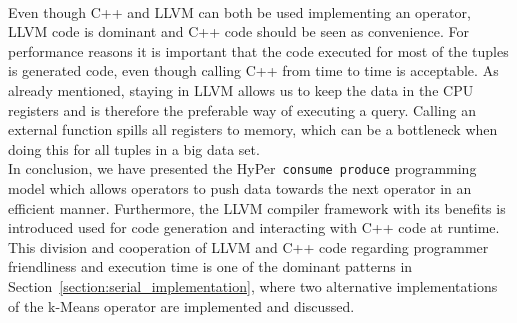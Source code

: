 \\
Even though C++ and LLVM can both be used implementing an operator, LLVM code is dominant and C++ code should be seen as convenience. For performance reasons it is important that the code executed for most of the tuples is generated code, even though calling C++ from time to time is acceptable. As already mentioned, staying in LLVM allows us to keep the data in the CPU registers and is therefore the preferable way of executing a query. Calling an external function spills all registers to memory, which can be a bottleneck when doing this for all tuples in a big data set.
\\
In conclusion, we have presented the HyPer~\texttt{consume produce} programming model which allows operators to push data towards the next operator in an efficient manner. Furthermore, the LLVM compiler framework with its benefits is introduced used for code generation and interacting with C++ code at runtime. 
This division and cooperation of LLVM and C++ code regarding programmer friendliness and execution time is one of the dominant patterns in Section~\ref{section:serial_implementation}, where two alternative implementations of the k-Means operator are implemented and discussed. 



